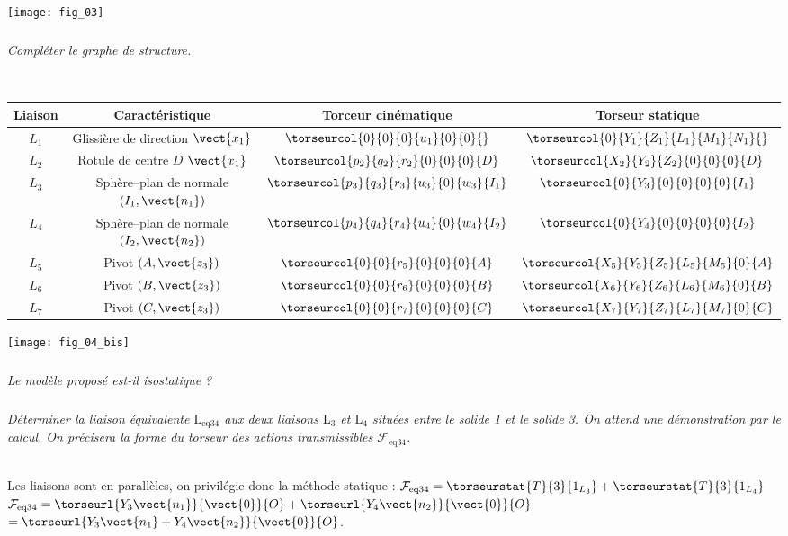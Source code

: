 \begin{multicols}{2}
\begin{center}
\texttt{[image: fig\_03]}
\textit{}
\end{center}


\subparagraph{}\textit{Compléter le graphe de structure.}%
\ifprof
\begin{corrige}~\\
\begin{center}
\begin{tabular}{|c|c|c|c|}
\hline
Liaison & Caractéristique & Torceur cinématique & Torseur statique \\
\hline\hline
$L_1 $ & Glissière de direction $\vect{x_1}$ & 
$\torseurcol{0}{0}{0}{u_1}{0}{0}{}$ & 
$\torseurcol{0}{Y_1}{Z_1}{L_1}{M_1}{N_1}{}$ \\ \hline
$L_2 $ & Rotule de centre $D$ $\vect{x_1}$ & 
$\torseurcol{p_2}{q_2}{r_2}{0}{0}{0}{D}$ & 
$\torseurcol{X_2}{Y_2}{Z_2}{0}{0}{0}{D}$ \\ \hline
$L_3 $ & Sphère--plan de normale $\left(I_1,\vect{n_1}\right)$ & 
$\torseurcol{p_3}{q_3}{r_3}{u_3}{0}{w_3}{I_1}$ & 
$\torseurcol{0}{Y_3}{0}{0}{0}{0}{I_1}$ \\ \hline
$L_4 $ & Sphère--plan de normale $\left(I_2,\vect{n_2}\right)$ & 
$\torseurcol{p_4}{q_4}{r_4}{u_4}{0}{w_4}{I_2}$ & 
$\torseurcol{0}{Y_4}{0}{0}{0}{0}{I_2}$ \\ \hline
$L_5 $ & Pivot $\left(A,\vect{z_3}\right)$ & 
$\torseurcol{0}{0}{r_5}{0}{0}{0}{A}$ & 
$\torseurcol{X_5}{Y_5}{Z_5}{L_5}{M_5}{0}{A}$ \\ \hline
$L_6 $ & Pivot $\left(B,\vect{z_3}\right)$ & 
$\torseurcol{0}{0}{r_6}{0}{0}{0}{B}$ & 
$\torseurcol{X_6}{Y_6}{Z_6}{L_6}{M_6}{0}{B}$ \\ \hline
$L_7 $ & Pivot $\left(C,\vect{z_3}\right)$ & 
$\torseurcol{0}{0}{r_7}{0}{0}{0}{C}$ & 
$\torseurcol{X_7}{Y_7}{Z_7}{L_7}{M_7}{0}{C}$ \\ \hline
\end{tabular}
\end{center}
\end{corrige}
\else
\fi

\begin{center}
\texttt{[image: fig\_04\_bis]}
\end{center}

\subparagraph{}\textit{Le modèle proposé est-il isostatique ?}

\subparagraph{}\textit{Déterminer la liaison équivalente $\text{L}_{\text{eq}34}$ aux deux liaisons $\text{L}_{3}$ et $\text{L}_{4}$ situées entre le solide 1 et le solide 3. On attend une démonstration par le calcul. On précisera la forme du torseur des actions transmissibles $\mathcal{F}_{\text{eq}34}$.}
\ifprof
\begin{corrige}~\\
Les liaisons sont en parallèles, on privilégie donc la méthode statique : 
$\mathcal{F}_{\text{eq}34} =\torseurstat{T}{3}{1_{L_3}}+\torseurstat{T}{3}{1_{L_4}}$ 
$\mathcal{F}_{\text{eq}34} =\torseurl{Y_3\vect{n_1}}{\vect{0}}{O}+ \torseurl{Y_4\vect{n_2}}{\vect{0}}{O}$
$=\torseurl{Y_3\vect{n_1}+Y_4\vect{n_2}}{\vect{0}}{O}$. 


\end{corrige}
\end{multicols}
